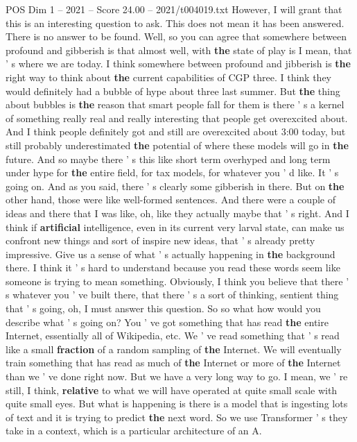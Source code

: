 \begin{textsample}{POS Dim 1 – 2021 – Score 24.00 – 2021/t004019.txt}
However, I will grant that this is an interesting question to ask.
This does not mean it has been answered.
There is no answer to be found.
Well, so you can agree that somewhere between profound and gibberish is that almost well, with \textbf{the} state of play is I mean, that ' s where we are today.
I think somewhere between profound and jibberish is \textbf{the} right way to think about \textbf{the} current capabilities of CGP three.
I think they would definitely had a bubble of hype about three last summer.
But \textbf{the} thing about bubbles is \textbf{the} reason that smart people fall for them is there ' s a kernel of something really real and really interesting that people get overexcited about.
And I think people definitely got and still are overexcited about 3:00 today, but still probably underestimated \textbf{the} potential of where these models will go in \textbf{the} future.
And so maybe there ' s this like short term overhyped and long term under hype for \textbf{the} entire field, for tax models, for whatever you ' d like.
It ' s going on.
And as you said, there ' s clearly some gibberish in there.
But on \textbf{the} other hand, those were like well-formed sentences.
And there were a couple of ideas and there that I was like, oh, like they actually maybe that ' s right.
And I think if \textbf{artificial} intelligence, even in its current very larval state, can make us confront new things and sort of inspire new ideas, that ' s already pretty impressive.
Give us a sense of what ' s actually happening in \textbf{the} background there.
I think it ' s hard to understand because you read these words seem like someone is trying to mean something.
Obviously, I think you believe that there ' s whatever you ' ve built there, that there ' s a sort of thinking, sentient thing that ' s going, oh, I must answer this question.
So so what how would you describe what ' s going on?
You ' ve got something that has read \textbf{the} entire Internet, essentially all of Wikipedia, etc.
We ' ve read something that ' s read like a small \textbf{fraction} of a random sampling of \textbf{the} Internet.
We will eventually train something that has read as much of \textbf{the} Internet or more of \textbf{the} Internet than we ' ve done right now.
But we have a very long way to go.
I mean, we ' re still, I think, \textbf{relative} to what we will have operated at quite small scale with quite small eyes.
But what is happening is there is a model that is ingesting lots of text and it is trying to predict \textbf{the} next word.
So we use Transformer ' s they take in a context, which is a particular architecture of an A.

\end{textsample}
